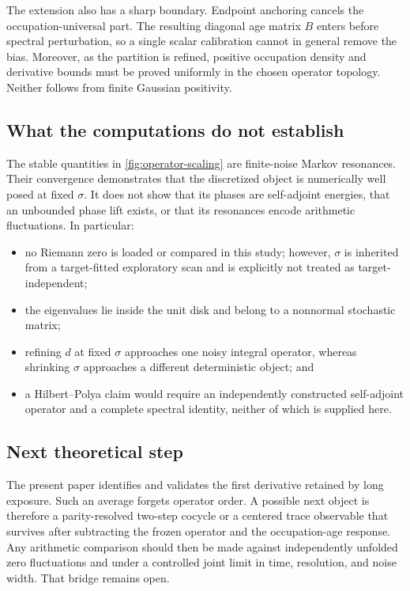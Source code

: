\documentclass[11pt]{article}
\theoremstyle{definition}
\theoremstyle{remark}
\begin{document}
The extension also has a sharp boundary.  Endpoint anchoring cancels the
occupation-universal part.  The resulting diagonal age matrix $B$ enters
before spectral perturbation, so a single scalar calibration cannot in
general remove the bias.  Moreover, as the partition is refined, positive
occupation density and derivative bounds must be proved uniformly in the
chosen operator topology.  Neither follows from finite Gaussian positivity.

\subsection{What the computations do not establish}

The stable quantities in \cref{fig:operator-scaling} are finite-noise Markov
resonances.  Their convergence demonstrates that the discretized object is
numerically well posed at fixed $\sigma$.  It does not show that its phases
are self-adjoint energies, that an unbounded phase lift exists, or that its
resonances encode arithmetic fluctuations.  In particular:
\begin{itemize}[leftmargin=2em]
  \item no Riemann zero is loaded or compared in this study; however,
  $\sigma$ is inherited from a target-fitted exploratory scan and is
  explicitly not treated as target-independent;
  \item the eigenvalues lie inside the unit disk and belong to a nonnormal
  stochastic matrix;
  \item refining $d$ at fixed $\sigma$ approaches one noisy integral
  operator, whereas shrinking $\sigma$ approaches a different deterministic
  object; and
  \item a Hilbert--Polya claim would require an independently constructed
  self-adjoint operator and a complete spectral identity, neither of which is
  supplied here.
\end{itemize}

\subsection{Next theoretical step}

The present paper identifies and validates the first derivative retained by
long exposure.  Such an average forgets operator order.  A possible next
object is therefore a parity-resolved two-step cocycle or a centered trace
observable that survives after subtracting the frozen operator and the
occupation-age response.  Any arithmetic comparison should then be made
against independently unfolded zero fluctuations and under a controlled
joint limit in time, resolution, and noise width.  That bridge remains open.
\end{document}
